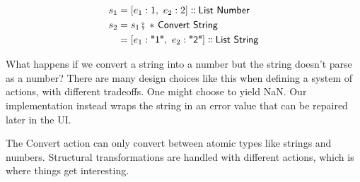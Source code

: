 \documentclass[english,submission]{programming}
\theoremstyle{definition}
\newcommand{\mathbox}[1]{\colorbox{black!10}{$#1$}}
\DeclareMathOperator{\exec}{\fatsemi\ }
\newcommand{\isa}{\dblcolon}
\newcommand{\quotedstring}[1]{\textsf{\textquotedbl{#1}\textquotedbl}}
\begin{document}
\begin{align*}
s_1 &= [ e_1: 1,\  e_2: 2] \isa \textsf{List Number}\\
s_2 &= s_1 \exec * \textsf{ Convert } \textsf{String}\\
    &= [ e_1: \quotedstring{1},\  e_2: \quotedstring{2}] \isa \textsf{List String}\\
\end{align*}

What happens if we convert a string into a number but the string doesn't parse as a number? There are many design choices like this when defining a system of actions, with different tradeoffs. One might choose to yield \textsf{NaN}. Our implementation instead wraps the string in an error value that can be repaired later in the UI.

The \textsf{Convert} action can only convert between atomic types like strings and numbers. Structural transformations are handled with different actions, which is where things get interesting.





\end{document}
